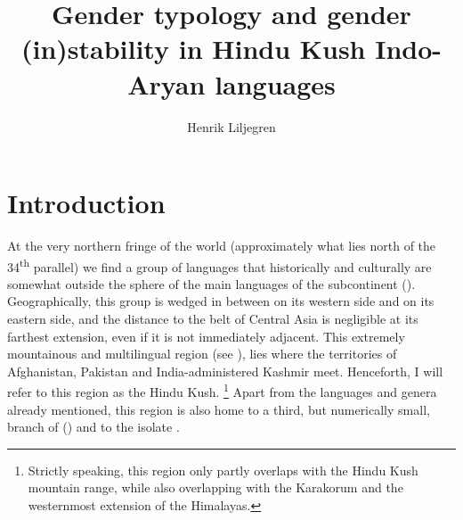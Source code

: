 \documentclass[output=collectionpaper]{langsci/langscibook}
\title{Gender typology and gender (in)stability in Hindu Kush Indo-Aryan languages}
\author{Henrik Liljegren\affiliation{Stockholm University}}
\begin{document}
\label{ch:Liljegren}

\section{Introduction}
\label{sec:Lilje:1}

At the very northern fringe of the  world (approximately what lies north of the 34\textsuperscript{th} parallel) we find a group of languages that historically and culturally are somewhat outside the sphere of the main  languages of the subcontinent (\citealt[20--21]{Masica1991}). Geographically, this group is wedged in between  on its western side and  on its eastern side, and the distance to the  belt of Central Asia is negligible at its farthest extension, even if it is not immediately adjacent.
This extremely mountainous and multilingual region (see ), lies where the territories of Afghanistan, Pakistan and India-administered Kashmir meet. Henceforth, I will refer to this region as the Hindu Kush.%
\footnote{
Strictly speaking, this region only partly overlaps with the Hindu Kush mountain range, while also overlapping with the Karakorum and the westernmost extension of the Himalayas.
} %
Apart from the languages and genera already mentioned, this region is also home to  \textendash{} a third, but numerically small, branch of  (\citealt[297--298]{Strand1973}) \textendash{} and to the isolate .
\end{document}
